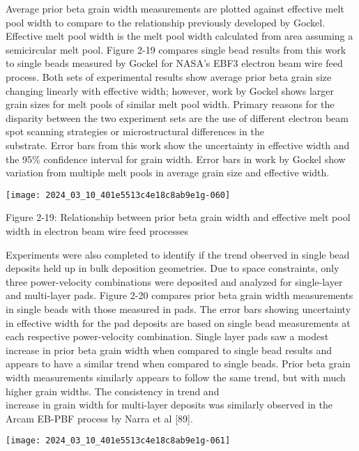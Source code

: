 \documentclass[10pt]{article}
\begin{document}
Average prior beta grain width measurements are plotted against effective melt pool width to compare to the relationship previously developed by Gockel. Effective melt pool width is the melt pool width calculated from area assuming a semicircular melt pool. Figure 2-19 compares single bead results from this work to single beads measured by Gockel for NASA's EBF3 electron beam wire feed process. Both sets of experimental results show average prior beta grain size changing linearly with effective width; however, work by Gockel shows larger grain sizes for melt pools of similar melt pool width. Primary reasons for the disparity between the two experiment sets are the use of different electron beam spot scanning strategies or microstructural differences in the\\
substrate. Error bars from this work show the uncertainty in effective width and the 95\% confidence interval for grain width. Error bars in work by Gockel show variation from multiple melt pools in average grain size and effective width.

\begin{center}
\texttt{[image: 2024\_03\_10\_401e5513c4e18c8ab9e1g-060]}
\end{center}

Figure 2-19: Relationship between prior beta grain width and effective melt pool width in electron beam wire feed processes

Experiments were also completed to identify if the trend observed in single bead deposits held up in bulk deposition geometries. Due to space constraints, only three power-velocity combinations were deposited and analyzed for single-layer and multi-layer pads. Figure 2-20 compares prior beta grain width measurements in single beads with those measured in pads. The error bars showing uncertainty in effective width for the pad deposits are based on single bead measurements at each respective power-velocity combination. Single layer pads saw a modest increase in prior beta grain width when compared to single bead results and appears to have a similar trend when compared to single beads. Prior beta grain width measurements similarly appears to follow the same trend, but with much higher grain widths. The consistency in trend and\\
increase in grain width for multi-layer deposits was similarly observed in the Arcam EB-PBF process by Narra et al [89].

\begin{center}
\texttt{[image: 2024\_03\_10\_401e5513c4e18c8ab9e1g-061]}
\end{center}
\end{document}
